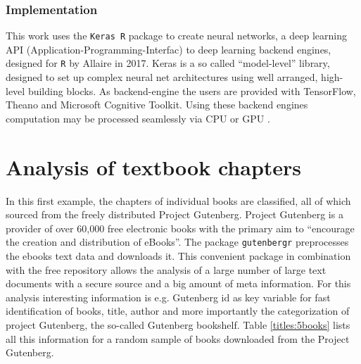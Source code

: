 \documentclass[11pt,a4paper]{article}
\begin{document}
\subsubsection{Implementation}
This work uses the \texttt{Keras R} package to create neural networks, a deep learning API (Application-Programming-Interfac) to deep learning backend engines, designed for \texttt{R} by Allaire in 2017. Keras is a so called “model-level” library, designed to set up complex neural net architectures using well arranged, high-level building blocks. As backend-engine the users are provided with TensorFlow, Theano and Microsoft Cognitive Toolkit. Using these backend engines computation may be processed seamlessly via CPU or GPU \cite{Chollet2018}.

\section{Analysis of textbook chapters}\label{sec:analysis}

In this first example, the chapters of individual books are classified, all of which sourced from the freely distributed Project Gutenberg. Project Gutenberg is a provider of over 60,000 free electronic books with the primary aim to “encourage the creation and distribution of eBooks”\cite{ProjectGutenberg}. The package \texttt{gutenbergr} \cite{gutenbergr} preprocesses the ebooks text data and downloads it. This convenient package in combination with the free repository allows the analysis of a large number of large text documents with a secure source and a big amount of meta information. For this analysis interesting information is e.g. Gutenberg id as key variable for fast identification of books, title, author and more importantly the categorization of project Gutenberg, the so-called Gutenberg bookshelf. Table \ref{titles:5books} lists all this information for a random sample of books downloaded from the Project Gutenberg.
\end{document}
